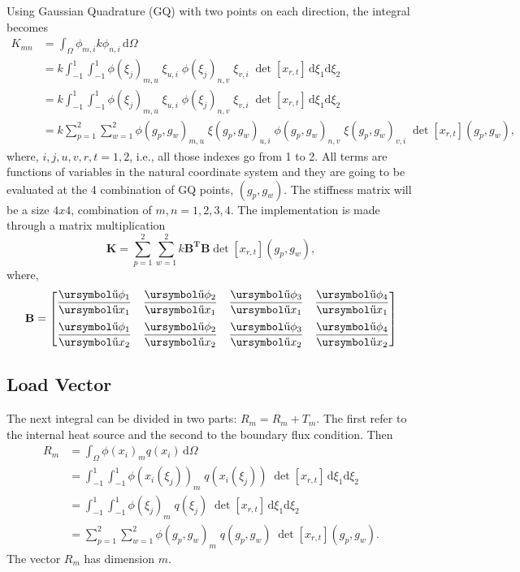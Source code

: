 \documentclass[10pt, a4paper]{article}
\def\urpartial{\mbox{\ursymbol\char"B6}}
\begin{document}
Using Gaussian Quadrature (GQ) with two points on each direction, the integral becomes
\begin{align*}
K_{mn} &=  \int_{\Omega} \phi_{m,i} k \phi_{n,i}  \, \mathrm{d}\Omega  \\
		&= k \int_{-1}^1 \int_{-1}^1 \phi(\xi_j)_{m,u} \; \xi_{u,i} \; \phi(\xi_j)_{n,v} \; \xi_{v,i} \; \det[x_{r,t}]  \, \mathrm{d}\xi_1 \mathrm{d}\xi_2 \\
		&= k \int_{-1}^1 \int_{-1}^1 \phi(\xi_j)_{m,u} \; \xi_{u,i} \; \phi(\xi_j)_{n,v} \; \xi_{v,i} \; \det[x_{r,t}]\, \mathrm{d}\xi_1 \mathrm{d}\xi_2 \\
		&= k \sum_{p=1}^2 \sum_{w=1}^2 \phi(g_p, g_w)_{m,u} \; \xi(g_p, g_w)_{u,i}  \; \phi(g_p, g_w)_{n,v} \; \xi(g_p, g_w)_{v,i} \; \det[x_{r,t}](g_p, g_w),
\end{align*}
where, $i,j,u,v,r,t=1,2$, i.e., all those indexes go from 1 to 2. All terms are functions of variables in the natural coordinate system and they are going to be evaluated at the 4 combination of GQ points, $(g_p, g_w)$. The stiffness matrix will be a size $4x4$, combination of $m,n =1,2,3,4$. The implementation is made through a matrix multiplication
\begin{equation*}
\mathbf{K} = \sum_{p=1}^2 \sum_{w=1}^2 k\mathbf{B^T} \mathbf{B} \det[x_{r,t}](g_p, g_w),
\end{equation*}
where,
\begin{equation*}
\mathbf{B} =  \begin{bmatrix}
\dfrac{\urpartial \phi_1}{\urpartial x_1} & \dfrac{\urpartial \phi_2}{\urpartial x_1} & \dfrac{\urpartial \phi_3}{\urpartial x_1} & \dfrac{\urpartial \phi_4}{\urpartial x_1} \\[.4cm]
\dfrac{\urpartial \phi_1}{\urpartial x_2} & \dfrac{\urpartial \phi_2}{\urpartial x_2} & \dfrac{\urpartial \phi_3}{\urpartial x_2} & \dfrac{\urpartial \phi_4}{\urpartial x_2} 
\end{bmatrix}
\end{equation*}

\subsection{Load Vector}


The next integral can be divided in two parts: $R_m = R_m + T_m$. The first refer to the internal heat source and the second to the boundary flux condition. Then
\begin{align*}
R_m &= \int_\Omega  \phi(x_i)_m q(x_i)   \, \mathrm{d}\Omega \\
	&= \int_{-1}^1 \int_{-1}^1 \phi(x_i(\xi_j))_m \; q(x_i(\xi_j)) \; \det[x_{r,t}]\, \mathrm{d}\xi_1 \mathrm{d}\xi_2 \\
	&= \int_{-1}^1 \int_{-1}^1 \phi(\xi_j)_m \; q(\xi_j) \; \det[x_{r,t}]\, \mathrm{d}\xi_1 \mathrm{d}\xi_2 \\ 
	&= \sum_{p=1}^2 \sum_{w=1}^2 \phi(g_p, g_w)_m \; q(g_p, g_w) \; \det[x_{r,t}](g_p, g_w).
\end{align*}
The vector $R_m$ has dimension $m$. 
\end{document}
